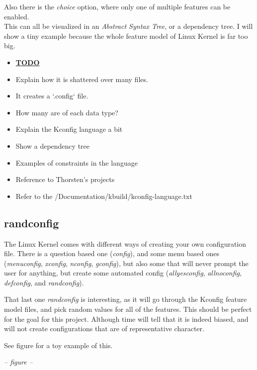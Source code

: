 \documentclass[a4paper,11pt]{article}
\begin{document}
Also there is the \emph{choice} option, where only one of multiple features 
can be enabled. \\


This can all be visualized in an \emph{Abstract Syntax Tree}, or a dependency 
tree. I will show a tiny example because the whole feature model of Linux 
Kernel is far too big.


\begin{itemize}
    \item \underline{\textbf{TODO}}
    \item Explain how it is shattered over many files.
    \item It creates a `.config` file.
    \item How many are of each data type?
    \item Explain the Kconfig language a bit
    \item Show a dependency tree
    \item Examples of constraints in the language
    \item Reference to Thorsten's projects
    \item Refer to the /Documentation/kbuild/kconfig-language.txt
\end{itemize}

\subsection{randconfig}

The Linux Kernel comes with different ways of creating your own configuration 
file. There is a question based one (\emph{config}), and some menu based ones 
(\emph{menuconfig}, \emph{xconfig}, \emph{nconfig}, \emph{gconfig}), but also 
some that will never prompt the user for anything, but create some automated 
config (\emph{allyesconfig}, \emph{allnoconfig}, \emph{defconfig}, and 
\emph{randconfig}).

That last one \emph{randconfig} is interesting, as it will go through the 
Kconfig feature model files, and pick random values for all of the features. 
This should be perfect for the goal for this project. Although time will tell 
that it is indeed biased, and will not create configurations that are of 
representative character. 

See figure for a toy example of this.


\begin{center}
    \emph{-- figure --}
\end{center}
\end{document}
